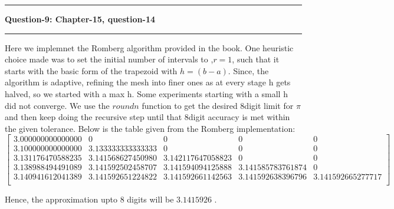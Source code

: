 \documentclass{article}
\newcommand\question[2]{\vspace{.25in}\hrule\textbf{#1: #2}\hrule\vspace{.10in}}
\begin{document}
  \question{Question-9}{Chapter-15, question-14}
  Here we implemnet the Romberg algorithm provided in the book. One heuristic choice made was to set the initial number of intervals to ,$r=1$, such that it starts with the basic form of the trapezoid with $h=(b-a)$. Since, the algorithm is adaptive, refining the mesh into finer ones as at every stage h gets halved, so we started with a max h. Some experiments starting with a small h did not converge. We use the $roundn$ function to get the desired 8digit limit for $\pi$ and then keep doing the recursive step until that 8digit accuracy is met within the given tolerance. Below is the table given from the Romberg implementation: \newline
  $\begin{bmatrix}
	  3.000000000000000 &                 0 &                 0 &                 0 &                 0 \\
	  3.100000000000000 & 3.133333333333333 &                 0 &                 0 &                 0 \\
	  3.131176470588235 & 3.141568627450980 & 3.142117647058823 &                 0 &                 0 \\
	  3.138988494491089 & 3.141592502458707 & 3.141594094125888 & 3.141585783761874 &                 0 \\
	  3.140941612041389 & 3.141592651224822 & 3.141592661142563 & 3.141592638396796 & 3.141592665277717 \\
   \end{bmatrix}$

   Hence, the approximation upto 8 digits will be $3.1415926$ .
\end{document}
